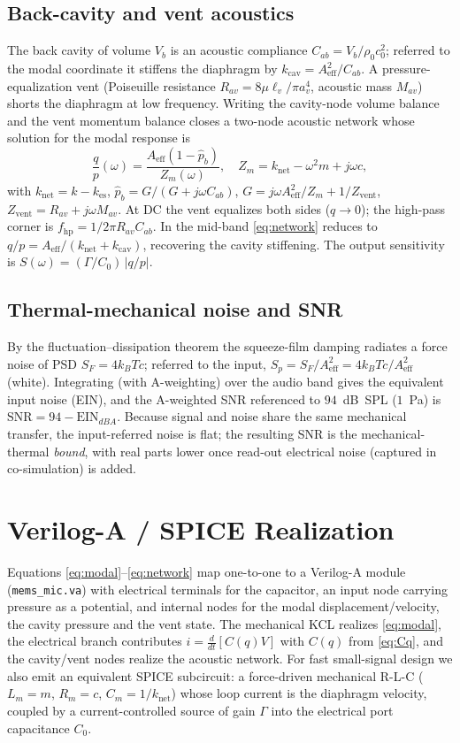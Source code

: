 \documentclass[conference]{IEEEtran}
\begin{document}
\subsection{Back-cavity and vent acoustics}
The back cavity of volume $V_b$ is an acoustic compliance
$C_{ab}=V_b/\rho_0 c_0^2$; referred to the modal coordinate it stiffens the
diaphragm by $k_\mathrm{cav}=A_\mathrm{eff}^2/C_{ab}$. A pressure-equalization
vent (Poiseuille resistance $R_{av}=8\mu\ell_v/\pi a_v^4$, acoustic mass $M_{av}$)
shorts the diaphragm at low frequency. Writing the cavity-node volume balance and
the vent momentum balance closes a two-node acoustic network whose solution for
the modal response is
\begin{equation}
\frac{q}{p}(\omega)=\frac{A_\mathrm{eff}(1-\hat p_b)}{Z_m(\omega)},\quad
Z_m=k_\mathrm{net}-\omega^2 m+j\omega c,
\label{eq:network}
\end{equation}
with $k_\mathrm{net}=k-k_\mathrm{es}$, $\hat p_b=G/(G+j\omega C_{ab})$,
$G=j\omega A_\mathrm{eff}^2/Z_m+1/Z_\mathrm{vent}$,
$Z_\mathrm{vent}=R_{av}+j\omega M_{av}$. At DC the vent equalizes both sides
($q\!\to\!0$); the high-pass corner is $f_\mathrm{hp}=1/2\pi R_{av}C_{ab}$. In the
mid-band \eqref{eq:network} reduces to
$q/p=A_\mathrm{eff}/(k_\mathrm{net}+k_\mathrm{cav})$, recovering the cavity
stiffening. The output sensitivity is
$S(\omega)=(\Gamma/C_0)\,|q/p|$.

\subsection{Thermal-mechanical noise and SNR}
By the fluctuation--dissipation theorem the squeeze-film damping radiates a force
noise of PSD $S_F=4k_BTc$; referred to the input,
$S_p=S_F/A_\mathrm{eff}^2=4k_BTc/A_\mathrm{eff}^2$ (white). Integrating (with
A-weighting) over the audio band gives the equivalent input noise (EIN), and the
A-weighted SNR referenced to $94$~dB~SPL ($1$~Pa) is $\mathrm{SNR}=94-\mathrm{EIN}_{dBA}$.
Because signal and noise share the same mechanical transfer, the input-referred
noise is flat; the resulting SNR is the mechanical-thermal \emph{bound}, with real
parts lower once read-out electrical noise (captured in co-simulation) is added.

\section{Verilog-A / SPICE Realization}
Equations \eqref{eq:modal}--\eqref{eq:network} map one-to-one to a Verilog-A
module (\texttt{mems\_mic.va}) with electrical terminals for the capacitor, an
input node carrying pressure as a potential, and internal nodes for the modal
displacement/velocity, the cavity pressure and the vent state. The mechanical
KCL realizes \eqref{eq:modal}, the electrical branch contributes
$i=\frac{d}{dt}[C(q)V]$ with $C(q)$ from \eqref{eq:Cq}, and the cavity/vent nodes
realize the acoustic network. For fast small-signal design we also emit an
equivalent SPICE subcircuit: a force-driven mechanical R-L-C ($L_m=m$, $R_m=c$,
$C_m=1/k_\mathrm{net}$) whose loop current is the diaphragm velocity, coupled by a
current-controlled source of gain $\Gamma$ into the electrical port capacitance
$C_0$.
\end{document}
